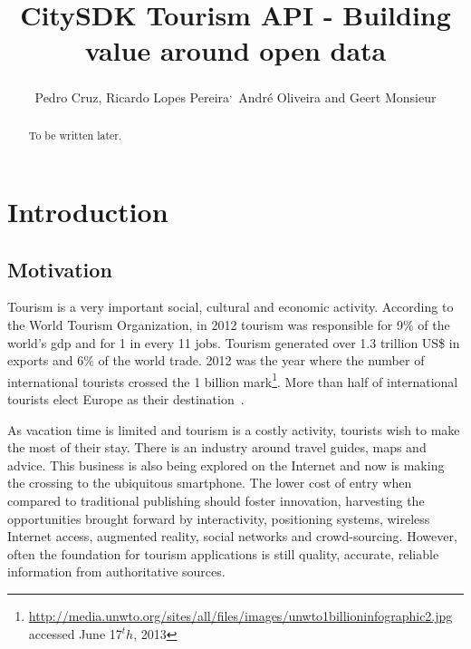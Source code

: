 \documentclass[times]{ettauth}
\begin{document}




\title{CitySDK Tourism API - Building value around open data}
\author{Pedro Cruz,
Ricardo Lopes Pereira\textsuperscript{,}\corrauth\,
Andr\'e Oliveira and 
Geert Monsieur}
\address{
 Instituto Superior T\'ecnico, Avenida Rovisco Pais 1, 1049-001 Lisboa, Portugal\\
 INESC-ID, Av. Prof. Dr. Cavaco Silva, 2744-016 Porto Salvo, Portugal\\
 ISA - Intelligent Sensing Anywhere S.A, Rua D. Manuel I, 30, 3030-320 Coimbra, Portugal\\
 European Research Institute in Service Science (ERISS), Tilburg University, Warandelaan 2, 5037AB Tilburg, The Netherlands
}

\begin{abstract}
To be written later.
\end{abstract}

\maketitle

\acresetall
\section{Introduction}

\subsection{Motivation}
\label{s:motivation}
Tourism is a very important social, cultural and economic activity.
According to the World Tourism Organization, in 2012 tourism was responsible for 9\% of the world's \ac{gdp} and for 1 in every 11 jobs.
Tourism generated over 1.3 trillion US\$ in exports and 6\% of the world trade.
2012 was the year where the number of international tourists crossed the 1 billion mark\footnote{\url{http://media.unwto.org/sites/all/files/images/unwto1billioninfographic2.jpg} accessed June 17$^th$, 2013}.
More than half of international tourists elect Europe as their destination~\cite{unwto}.

As vacation time is limited and tourism is a costly activity, tourists wish to make the most of their stay.
There is an industry around travel guides, maps and advice.
This business is also being explored on the Internet and now is making the crossing to the ubiquitous smartphone.
The lower cost of entry when compared to traditional publishing should foster innovation, harvesting the opportunities brought forward by interactivity, positioning systems, wireless Internet access, augmented reality, social networks and crowd-sourcing. 
However, often the foundation for tourism applications is still quality, accurate, reliable information from authoritative sources.
\end{document}
